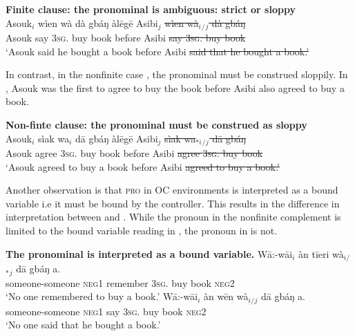 \documentclass[output=paper,colorlinks,citecolor=brown]{langscibook}
\begin{document}
\ea%
    \label{ex:sulemana:20}
    {\bf{Finite clause: the pronominal is ambiguous: strict or sloppy}}\\
    \gll    Asouk$_i$ wìen wà  dà gbáŋ àlēgē Asibi$_j$  {\sout{wìen wà$_i${}$_/${}$_j$  dà gbáŋ}} \\
            Asouk say \textsc{3sg}. buy book before Asibi {\sout{say \textsc{3sg}. buy book}}\\
    \glt    `Asouk said he bought a book before Asibi {\sout{said that he bought a book.'}} 
\z

In contrast, in the nonfinite case , the pronominal must be construed sloppily. In , Asouk was the first to agree to buy the book before Asibi also agreed to buy a book.

\ea%
    \label{ex:sulemana:21}
    {\bf{Non-finte clause: the pronominal must be construed as sloppy}}\\
    \gll    Asouk$_i$ sìak wa$_i$ dā gbáŋ àlēgē Asibi$_j$ {\sout{sìak wa$_{*i}${}$_/${}$_j$ dā gbáŋ}} \\
            Asouk agree \textsc{3sg}. buy book before Asibi {\sout{agree \textsc{3sg}. buy book}}\\
    \glt    `Asouk agreed to buy a book before Asibi {\sout{agreed to buy a book.'}}
\z

Another observation is that \textsc{pro} in OC environments is interpreted as a bound variable i.e it must be bound by the controller. This results in the difference in interpretation between  and . While the pronoun in the nonfinite complement is limited to the bound variable reading in , the pronoun in  is not. 

\ea%
    \label{ex:sulemana:22}
    {\bf{ The pronominal is interpreted as a bound variable.} }
    \ea%
    \label{ex:sulemana:22a}
    \gll    Wā:-wāi$_i$ àn tīeri  wà$_{i/}${}$_*${}$_j$ dā gbáŋ a. \\
            someone-someone  \textsc{neg1} remember \textsc{3sg}. buy book  \textsc{neg2} \\
    \glt    `No one remembered to buy a book.' 
    \ex%
    \label{ex:sulemana:22b}
    \gll    Wā:-wāi$_i$ àn wēn  wà$_{i/}${}$_j$ dā gbáŋ a. \\
            someone-someone \textsc{neg1} say \textsc{3sg}. buy book  \textsc{neg2}\\
    \glt    `No one said that he bought a book.' 
    \z
\z
\end{document}
